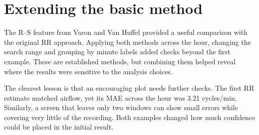 \section{Extending the basic method}

The R--S feature from Varon and Van Huffel \cite{varon2015} provided a useful comparison with the original RR approach. Applying both methods across the hour, changing the search range and grouping by minute labels added checks beyond the first example. These are established methods, but combining them helped reveal where the results were sensitive to the analysis choices.

The clearest lesson is that an encouraging plot needs further checks. The first RR estimate matched airflow, yet its MAE across the hour was 3.21 cycles/min. Similarly, a screen that leaves only two windows can show small errors while covering very little of the recording. Both examples changed how much confidence could be placed in the initial result.

